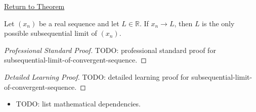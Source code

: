 \newpage
{}
\label{prf:subsequential-limit-of-convergent-sequence}

\begin{remark*}[Return]
\hyperref[thm:subsequential-limit-of-convergent-sequence]{Return to Theorem}
\end{remark*}

\begin{theorem*}
Let $(x_n)$ be a real sequence and let $L\in\mathbb{R}$. If $x_n\to L$,
then $L$ is the only possible subsequential limit of $(x_n)$.

\smallskip
\noindent
\end{theorem*}

\begin{proof}[Professional Standard Proof]
\LRAProofBodyStart
TODO: professional standard proof for subsequential-limit-of-convergent-sequence.
\end{proof}

\begin{proof}[Detailed Learning Proof]
\LRAProofBodyStart
TODO: detailed learning proof for subsequential-limit-of-convergent-sequence.
\end{proof}

\begin{remark*}
\end{remark*}

\begin{dependencies}
\begin{itemize}
  \item TODO: list mathematical dependencies.
\end{itemize}
\end{dependencies}

\clearpage
